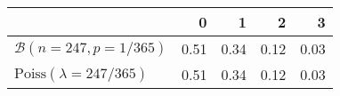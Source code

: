 \documentclass{standalone}
\begin{document}
\begin{tabular}{l|rrrr}
	\hline
	& 0 & 1 & 2 & 3 \\ 
	\hline
	$\mathcal{B}(n = 247, p = 1/365)$ & 0.51 & 0.34 & 0.12 & 0.03 \\ 
	$\text{Poiss}(\lambda = 247/365)$ & 0.51 & 0.34 & 0.12 & 0.03 \\ 
	\hline
\end{tabular}
\end{document}
